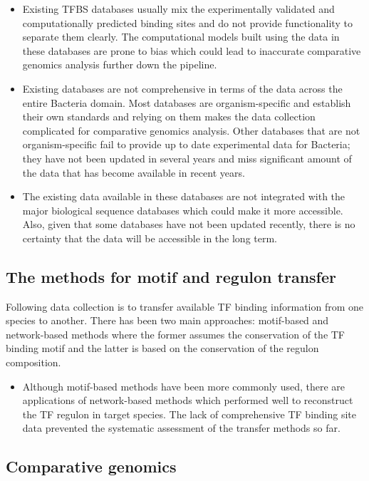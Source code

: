 \documentclass[12pt]{article}
\begin{document}
\begin{itemize}
\item Existing TFBS databases usually mix the experimentally validated and
  computationally predicted binding sites and do not provide functionality to
  separate them clearly. The computational models built using the data in these
  databases are prone to bias which could lead to inaccurate comparative
  genomics analysis further down the pipeline.

\item Existing databases are not comprehensive in terms of the data across the
  entire Bacteria domain. Most databases are organism-specific and establish
  their own standards and relying on them makes the data collection complicated
  for comparative genomics analysis. Other databases that are not
  organism-specific fail to provide up to date experimental data for Bacteria;
  they have not been updated in several years and miss significant amount of
  the data that has become available in recent years.

\item The existing data available in these databases are not integrated with
  the major biological sequence databases which could make it more
  accessible. Also, given that some databases have not been updated recently,
  there is no certainty that the data will be accessible in the long term.
\end{itemize}

\subsection{The methods for motif and regulon transfer}
Following data collection is to transfer available TF binding information from
one species to another. There has been two main approaches: motif-based and
network-based methods where the former assumes the conservation of the TF
binding motif and the latter is based on the conservation of the regulon
composition.

\begin{itemize}
\item Although motif-based methods have been more commonly used, there are
  applications of network-based methods which performed well to reconstruct the
  TF regulon in target species. The lack of comprehensive TF binding site data
  prevented the systematic assessment of the transfer methods so far.
\end{itemize}

\subsection{Comparative genomics}
\end{document}
